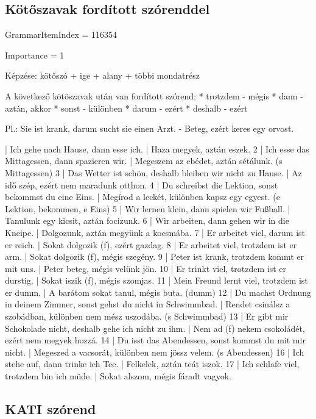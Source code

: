 \documentclass{article}
\newenvironment{desc}{\verbatim}{\endverbatim}
\newenvironment{exmp}{\verbatim}{\endverbatim}
\begin{document}
\subsection{Kötőszavak fordított szórenddel}

GrammarItemIndex = 116354

Importance = 1

\begin{desc}
Képzése: kötőszó + ige + alany + többi mondatrész

A következő kötöszavak után van fordított szórend:
* trotzdem - mégis
* dann - aztán, akkor
* sonst - különben
* darum - ezért
* deshalb - ezért

Pl.: Sie ist krank, darum sucht sie einen Arzt. - Beteg, ezért keres egy orvost.
\end{desc}

\begin{exmp}
1 | Ich gehe nach Hause, dann esse ich. | Haza megyek, aztán eszek.
2 | Ich esse das Mittagessen, dann spazieren wir. | Megeszem az ebédet, aztán sétálunk. (s Mittagessen)
3 | Das Wetter ist schön, deshalb bleiben wir nicht zu Hause. | Az idő szép, ezért nem maradunk otthon.
4 | Du schreibst die Lektion, sonst bekommst du eine Eins. | Megírod a leckét, különben kapsz egy egyest. (e Lektion, bekommen, e Eins)
5 | Wir lernen klein, dann spielen wir Fußball. | Tanulunk egy kicsit, aztán focizunk.
6 | Wir arbeiten, dann gehen wir in die Kneipe. | Dolgozunk, aztán megyünk a kocsmába.
7 | Er arbeitet viel, darum ist er reich. | Sokat dolgozik (f), ezért gazdag.
8 | Er arbeitet viel, trotzdem ist er arm. | Sokat dolgozik (f), mégis szegény.
9 | Peter ist krank, trotzdem kommt er mit uns. | Peter beteg, mégis velünk jön.
10 | Er trinkt viel, trotzdem ist er durstig. | Sokat iszik (f), mégis szomjas.
11 | Mein Freund lernt viel, trotzdem ist er dumm. | A barátom sokat tanul, mégis buta. (dumm)
12 | Du machst Ordnung in deinem Zimmer, sonst gehst du nicht in Schwimmbad. | Rendet csinálsz a szobádban, különben nem mész uszodába. (s Schwimmbad)
13 | Er gibt mir Schokolade nicht, deshalb gehe ich nicht zu ihm. | Nem ad (f) nekem csokoládét, ezért nem megyek hozzá.
14 | Du isst das Abendessen, sonst kommst du mit mir nicht. | Megeszed a vacsorát, különben nem jössz velem. (s Abendessen)
16 | Ich stehe auf, dann trinke ich Tee. | Felkelek, aztán teát iszok.
17 | Ich schlafe viel, trotzdem bin ich müde. | Sokat alszom, mégis fáradt vagyok.
\end{exmp}

\subsection{KATI szórend}
\end{document}

